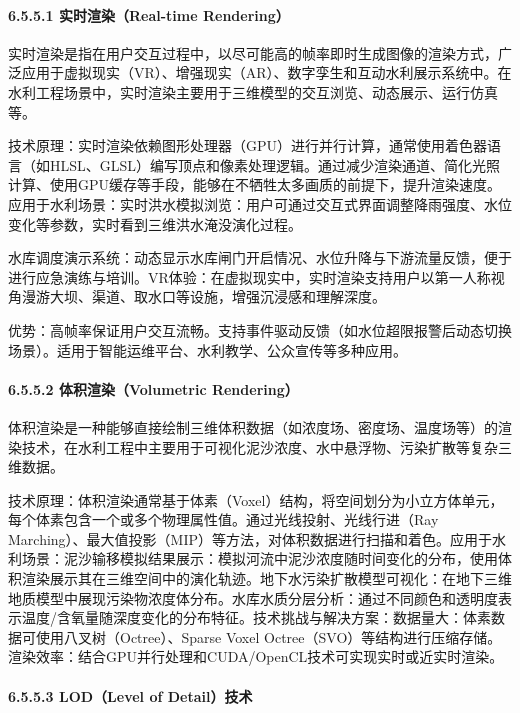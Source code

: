 \paragraph{6.5.5.1 实时渲染（Real-time Rendering）}\label{ux5b9eux65f6ux6e32ux67d3real-time-rendering}

实时渲染是指在用户交互过程中，以尽可能高的帧率即时生成图像的渲染方式，广泛应用于虚拟现实（VR）、增强现实（AR）、数字孪生和互动水利展示系统中。在水利工程场景中，实时渲染主要用于三维模型的交互浏览、动态展示、运行仿真等。

技术原理：实时渲染依赖图形处理器（GPU）进行并行计算，通常使用着色器语言（如HLSL、GLSL）编写顶点和像素处理逻辑。通过减少渲染通道、简化光照计算、使用GPU缓存等手段，能够在不牺牲太多画质的前提下，提升渲染速度。应用于水利场景：实时洪水模拟浏览：用户可通过交互式界面调整降雨强度、水位变化等参数，实时看到三维洪水淹没演化过程。

水库调度演示系统：动态显示水库闸门开启情况、水位升降与下游流量反馈，便于进行应急演练与培训。VR体验：在虚拟现实中，实时渲染支持用户以第一人称视角漫游大坝、渠道、取水口等设施，增强沉浸感和理解深度。

优势：高帧率保证用户交互流畅。支持事件驱动反馈（如水位超限报警后动态切换场景）。适用于智能运维平台、水利教学、公众宣传等多种应用。

\paragraph{6.5.5.2 体积渲染（Volumetric Rendering）}\label{ux4f53ux79efux6e32ux67d3volumetric-rendering}

体积渲染是一种能够直接绘制三维体积数据（如浓度场、密度场、温度场等）的渲染技术，在水利工程中主要用于可视化泥沙浓度、水中悬浮物、污染扩散等复杂三维数据。

技术原理：体积渲染通常基于体素（Voxel）结构，将空间划分为小立方体单元，每个体素包含一个或多个物理属性值。通过光线投射、光线行进（Ray Marching）、最大值投影（MIP）等方法，对体积数据进行扫描和着色。应用于水利场景：泥沙输移模拟结果展示：模拟河流中泥沙浓度随时间变化的分布，使用体积渲染展示其在三维空间中的演化轨迹。地下水污染扩散模型可视化：在地下三维地质模型中展现污染物浓度体分布。水库水质分层分析：通过不同颜色和透明度表示温度/含氧量随深度变化的分布特征。技术挑战与解决方案：数据量大：体素数据可使用八叉树（Octree）、Sparse Voxel Octree（SVO）等结构进行压缩存储。渲染效率：结合GPU并行处理和CUDA/OpenCL技术可实现实时或近实时渲染。

\paragraph{6.5.5.3 LOD（Level of Detail）技术}\label{lodlevel-of-detailux6280ux672f}

